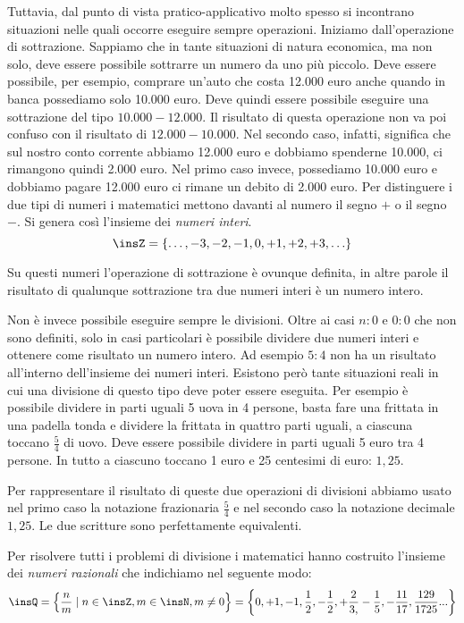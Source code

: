 Tuttavia, dal punto di vista pratico-applicativo molto spesso si incontrano 
situazioni nelle quali occorre eseguire sempre operazioni. Iniziamo 
dall'operazione di sottrazione. Sappiamo che in tante situazioni di natura 
economica, ma non solo, deve essere possibile sottrarre un numero da uno più 
piccolo. Deve essere possibile, per esempio, comprare un'auto che costa 12.000 
euro anche quando in banca possediamo solo 10.000 euro. Deve quindi essere 
possibile eseguire una sottrazione del tipo \(10.000-12.000\). Il risultato di 
questa operazione non va poi confuso con il risultato di \(12.000-10.000\). Nel 
secondo caso, infatti, significa che sul nostro conto corrente abbiamo 12.000 
euro e dobbiamo spenderne 10.000, ci rimangono quindi 2.000 euro. Nel primo 
caso 
invece, possediamo 10.000 euro e dobbiamo pagare
12.000 euro ci rimane un debito di 2.000 euro. Per distinguere i due tipi di 
numeri i matematici mettono davanti al numero il segno \(+\) o il segno \(-\). Si 
genera così l'insieme dei \emph{numeri interi}.
\[\insZ=\{\ldots,-3,-2,-1,0,+1,+2,+3,\ldots\}\]

Su questi numeri l'operazione di sottrazione è ovunque definita, in altre 
parole 
il risultato di qualunque sottrazione tra due numeri interi è un numero intero.

Non è invece possibile eseguire sempre le divisioni. Oltre ai casi \(n:0\) e 
\(0:0\) che non sono definiti, solo in casi particolari è possibile dividere 
due numeri interi e ottenere come risultato un numero intero. Ad esempio \(5:4\) 
non ha un risultato all'interno dell'insieme dei numeri interi. 
Esistono però tante situazioni reali in cui una divisione di questo tipo deve 
poter essere eseguita. Per esempio è possibile dividere in parti uguali 5 uova 
in 4 persone, basta fare una frittata in una padella tonda e dividere la 
frittata in quattro parti uguali, a ciascuna toccano \(\frac{5}{4}\) di uovo. Deve
essere possibile dividere in parti uguali 5 euro tra 4 persone. 
In tutto a ciascuno toccano 1 euro e 25 centesimi di euro: \(1,25\).

Per rappresentare il risultato di queste due operazioni di divisioni abbiamo 
usato nel primo caso la notazione frazionaria \(\frac{5}{4}\) e nel secondo caso 
la notazione decimale \(1,25\). Le due scritture sono perfettamente equivalenti.

Per risolvere tutti i problemi di divisione i matematici hanno costruito 
l'insieme dei \emph{numeri razionali} che indichiamo nel seguente modo:
\[
\insQ=\left\{\frac{n}{m} \mid n\in \insZ,m\in \insN,m\neq
0\right\}=\left\{0,+1,-1,\frac{1}{2},-\frac{1}{2},+\frac{2}{3,}-\frac{1}{5},
-\frac{11}{17},\frac{129}{1725}...\right\}
\]

